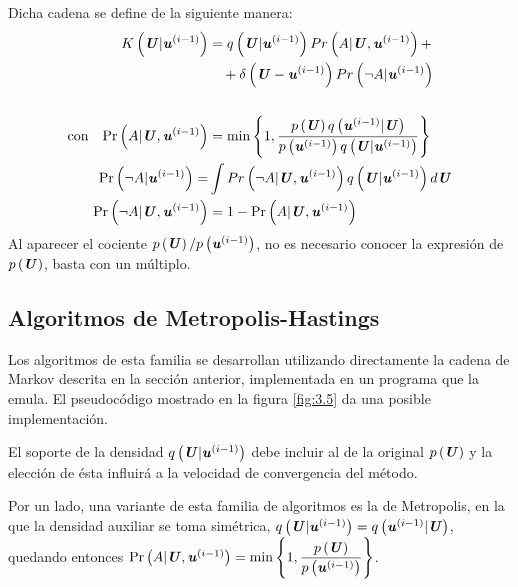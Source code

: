 Dicha cadena se define de la siguiente manera:
\begin{equation}
\begin{aligned}
    K\left(\textbf{\textit{U}}|\textbf{\textit{u}}^{(i-1)}\right) &= q\left(\textbf{\textit{U}}|\textbf{\textit{u}}^{(i-1)}\right)Pr\left(A|\textbf{\textit{U}}, \textbf{\textit{u}}^{(i-1)}\right) +\\
    &\quad + \delta\left(\textbf{\textit{U}}-\textbf{\textit{u}}^{(i-1)}\right)Pr\left(\neg A|\textbf{\textit{u}}^{(i-1)}\right) \\ \\
    \text{con} \quad \text{Pr}\left(A|\textbf{\textit{U}}, \textbf{\textit{u}}^{(i-1)}\right) &= \min\left\{1, \dfrac{p\left(\textbf{\textit{U}}\right)q\left(\textbf{\textit{u}}^{(i-1)}|\textbf{\textit{U}}\right)}{p\left(\textbf{\textit{u}}^{(i-1)}\right)q\left(\textbf{\textit{U}}|\textbf{\textit{u}}^{(i-1)}\right)}\right\} \\
    \text{Pr}\left(\neg A|\textbf{\textit{u}}^{(i-1)}\right) = &\int Pr\left(\neg A|\textbf{\textit{U}}, \textbf{\textit{u}}^{(i-1)}\right)q\left(\textbf{\textit{U}}|\textbf{\textit{u}}^{(i-1)}\right)d\textbf{\textit{U}} \\
    \text{Pr}\left(\neg A|\textbf{\textit{U}}, \textbf{\textit{u}}^{(i-1)}\right) &= 1 - \text{Pr}\left(A|\textbf{\textit{U}}, \textbf{\textit{u}}^{(i-1)}\right)
\end{aligned}
\label{ec:3.8}
\end{equation}
Al aparecer el cociente $p\left(\textbf{\textit{U}}\right) / p\left(\textbf{\textit{u}}^{(i-1)}\right)$, no es necesario conocer la expresión de $p\left(\textbf{\textit{U}}\right)$, basta con un múltiplo.

\subsection{Algoritmos de Metropolis-Hastings}
Los algoritmos de esta familia se desarrollan utilizando directamente la cadena de Markov descrita en la sección anterior, implementada en un programa que la emula. El pseudocódigo mostrado en la figura \ref{fig:3.5} da una posible implementación.

El soporte de la densidad $q\left(\textbf{\textit{U}}|\textbf{\textit{u}}^{(i-1)}\right)$ debe incluir al de la original $p\left(\textbf{\textit{U}}\right)$ y la elección de ésta influirá a la velocidad de convergencia del método.

Por un lado, una variante de esta familia de algoritmos es la de Metropolis, en la que la densidad auxiliar se toma simétrica, $q\left(\textbf{\textit{U}}|\textbf{\textit{u}}^{(i-1)}\right) = q\left(\textbf{\textit{u}}^{(i-1)}|\textbf{\textit{U}}\right)$, quedando entonces $\text{Pr}\left(A|\textbf{\textit{U}}, \textbf{\textit{u}}^{(i-1)}\right) = \min\left\{1, \dfrac{p\left(\textbf{\textit{U}}\right)}{p\left(\textbf{\textit{u}}^{(i-1)}\right)}\right\}$.

